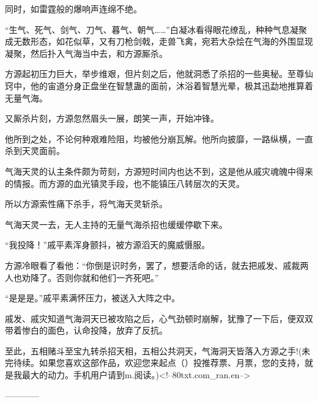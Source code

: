 \begin{this_body}
同时，如雷霆般的爆响声连绵不绝。

“生气、死气、剑气、刀气、暮气、朝气……”白凝冰看得眼花缭乱，种种气息凝聚成无数形态，如花似草，又有刀枪剑戟，走兽飞禽，宛若大杂烩在气海的外围显现凝聚，然后扑入气海当中去，和方源厮杀。

方源起初压力巨大，举步维艰，但片刻之后，他就洞悉了杀招的一些奥秘。至尊仙窍中，他的宙道分身正盘坐在智慧蛊的面前，沐浴着智慧光晕，极其迅勐地推算着无量气海。

又厮杀片刻，方源忽然眉头一展，朗笑一声，开始冲锋。

他所到之处，不论何种艰难险阻，均被他分崩瓦解。他所向披靡，一路纵横，一直杀到天灵面前。

气海天灵的认主条件颇为苛刻，方源短时间内也达不到，这是他从戚灾魂魄中得来的情报。而方源的血光镇灵手段，也不能镇压八转层次的天灵。

所以方源索性痛下杀手，将气海天灵斩杀。

气海天灵一去，无人主持的无量气海杀招也缓缓停歇下来。

“我投降！”戚平素浑身颤抖，被方源滔天的魔威慑服。

方源冷眼看了看他：“你倒是识时务，罢了，想要活命的话，就去把戚发、戚裁两人也劝降了。否则你就和他们一齐死吧。”

“是是是。”戚平素满怀压力，被送入大阵之中。

戚发、戚灾知道气海洞天已被攻陷之后，心气劲顿时崩解，犹豫了一下后，便双双带着惨白的面色，认命投降，放弃了反抗。

至此，五相赌斗至宝九转杀招天相，五相公共洞天，气海洞天皆落入方源之手!(未完待续。如果您喜欢这部作品，欢迎您来起点（）投推荐票、月票，您的支持，就是我最大的动力。手机用户请到m.阅读。)<!--80txt.com\_ran.en-->

------------

\end{this_body}

